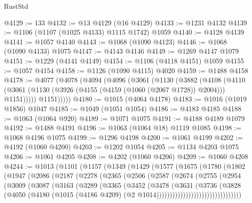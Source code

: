 \begin{lexlean}{RustStd}
\begin{coremodule}
{\begin{coremodule}
{{{{{{{{{{{{{{{{{{{{{{{{{{{{{{{{{{{@4129 := 133
@4132 := @13 @4129 (@16 @4129)
@4133 := @1231 @4132
@4139 := @1106 (@1107 (@1025 @4133) @1115 @1742) @1059
@4140 := @4128 @4139
@4141 := @1057 @4140
@4143 := @1068 (@1090 @4123)
@4146 := @1068 (@1090 @4133) @1075
@4147 := @4143 @4146
@4149 := @1269 @4147 @1079
@4151 := @1229 (@4141 @4149)
@4154 := @1106 (@4118 @4151) @1059
@4155 := @1057 @4154
@4158 := @1126 (@1090 @4115) @4020
@4159 := @1488 @4158
@4178 := @4077
    (@4078
      (@4094
        (@4096
          (@3061
            (@1130
              (@3882
                (@4108
                  (@4110
                    (@3061 (@1130 (@3926 (@4155 (@4159 (@1060 (@2067 @1728)) @2004))) @1151)))))
              @1151)))))
@4180 := @1015 (@4064 @4178)
@4183 := @1016 (@1019 @1856) @1047
@4185 := @1049 (@1051 @1054)
@4186 := @4183 @4185
@4188 := @1063 (@1064 @920)
@4189 := @1071 @1075
@4191 := @4188 @4189 @1079
@4192 := @1488 @4191
@4196 := @1063 (@1064 @18) @1119 @1085
@4198 := @1068 @4196 @1075
@4199 := @1296 @4198
@4200 := @1061 @4199
@4202 := @4192 (@1060 @4200)
@4203 := @1202 @1054
@4205 := @1134 @4203 @1075
@4206 := @1061 @4205
@4208 := @4202 (@1060 @4206)
@4209 := @1060 @4208
@4244 := @1013
    (@1101
      (@1157
        (@1349
          (@1429
            (@1577
              (@1675
                (@1780
                  (@1802
                    (@1947
                      (@2086
                        (@2187
                          (@2278
                            (@2365
                              (@2506
                                (@2587
                                  (@2674
                                    (@2755
                                      (@2954
                                        (@3009
                                          (@3087
                                            (@3163
                                              (@3289
                                                (@3365
                                                  (@3452
                                                    (@3478
                                                      (@3631
                                                        (@3736
                                                          (@3828
                                                            (@4050
                                                              (@4180
                                                                (@1015
                                                                  (@4186 @4209)
                                                                  (@2
                                                                    @1014))))))))))))))))))))))))))))))))
}}}}}}}}}}}}}}}}}}}}}}}}}}}}}}}}}}}
\end{coremodule}}
\end{coremodule}
\end{lexlean}
